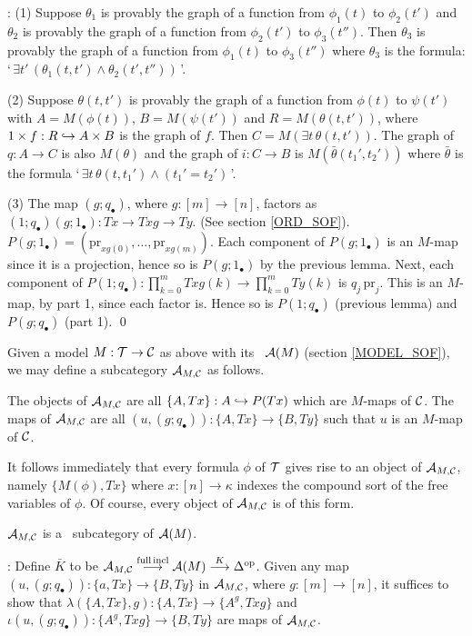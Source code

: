 : (1) Suppose $\theta_1$ is provably the graph of a 
function from $\phi_1(t)$ to $\phi_2(t')$ and $\theta_2$ is provably 
the graph of a function from $\phi_2(t')$ to $\phi_3(t'')$. Then 
$\theta_3$ is provably the graph of a function from $\phi_1(t)$ to 
$\phi_3(t'')$ where $\theta_3$ is the formula: `$\, \exists t' \, 
(\theta_1(t,t') \wedge \theta_2(t',t''))\,$'. 

(2) Suppose $\theta(t,t')$ is provably the graph of a function from 
$\phi(t)$ to $\psi(t')$ with $A=M(\phi(t))$, $B=M(\psi(t'))$ and 
$R=M(\theta(t,t'))$, where $1 \times f : R \hookrightarrow A \times B$ is the 
graph of $f$. Then $C=M(\exists t \, \theta(t,t'))$. The graph of $q 
: A \to C$ is also $M(\theta)$ and the graph of $i : C \to B$ is 
$M(\bar \theta (t_1',t_2'))$ where $\bar \theta$ is the formula `$\, 
\exists t \, \theta(t,t_1') \wedge (t_1'=t_2')\,$'. 

(3) The map $(g;q_\bullet)$, where $g : [m] \to [n]$, factors as 
$(1;q_\bullet)(g;1_\bullet) : Tx \to Txg \to Ty$. (See section 
\ref{ORD_SOF}). $P(g;1_\bullet) =
(\mbox{pr}_{xg(0)},\ldots,\mbox{pr}_{xg(m)})$. Each component of 
$P(g;1_\bullet)$ is an $M$-map since it is a projection, hence so is 
$P(g;1_\bullet)$ by the previous lemma. Next, each component of 
$P(1;q_\bullet) : \prod_{k=0}^m Txg(k) \to \prod_{k=0}^m Ty(k)$ is 
$q_j\, \mbox{pr}_j$. This is an $M$-map, by part 1, since each factor 
is. Hence so is $P(1;q_\bullet)$ (previous lemma) and 
$P(g;q_\bullet)$ (part 1). \qed \medskip 

Given a model $M : \cal T \to {\bf \cal C}$ as above with its \SOF\ ${\bf \cal A} 
(M)$ (section \ref{MODEL_SOF}), we may define a subcategory ${{\bf \cal A}}_{{M},{{\bf \cal C}}}$ as follows.

The objects of ${{\bf \cal A}}_{{M},{{\bf \cal C}}}$ are all $\{A,Tx\} : A \hookrightarrow P(Tx)$ which are 
$M$-maps of ${\bf \cal C}$. The maps of ${{\bf \cal A}}_{{M},{{\bf \cal C}}}$ are all 
$(u,(g;q_\bullet)) : \{A,Tx\} \to \{B,Ty\}$ such that $u$ is an 
$M$-map of ${\bf \cal C}$.

It follows immediately that every formula $\phi$ of $\cal T$ gives 
rise to an object of ${{\bf \cal A}}_{{M},{{\bf \cal C}}}$, namely $\{M(\phi), Tx \}$ where $x : 
[n] \to \kappa$ indexes the compound sort of the free variables of 
$\phi$. Of course, every object of ${{\bf \cal A}}_{{M},{{\bf \cal C}}}$ is of this form. 

\begin{thm}
${{\bf \cal A}}_{{M},{{\bf \cal C}}}$ is a \SOF\ subcategory of ${\bf \cal A} (M)$. \end{thm}

: Define $\bar K$ to be ${{\bf \cal A}}_{{M},{{\bf \cal C}}} \stackrel{{\rm full 
\, incl}}{\longrightarrow} {\bf \cal A} (M) \stackrel{K}{\longrightarrow} 
\Delta^{\rm op}$. Given any map $(u,(g;q_\bullet)) : \{a,Tx \} \to 
\{B,Ty\}$ in ${{\bf \cal A}}_{{M},{{\bf \cal C}}}$, where $g : [m] \to [n]$,
it suffices to show that $\lambda(\{A,Tx\},g) : \{A,Tx\} \to 
\{A^g,Txg\}$ and $\iota(u,(g;q_\bullet)) : \{A^g,Txg\} \to \{B,Ty\}$ 
are maps of ${{\bf \cal A}}_{{M},{{\bf \cal C}}}$.

